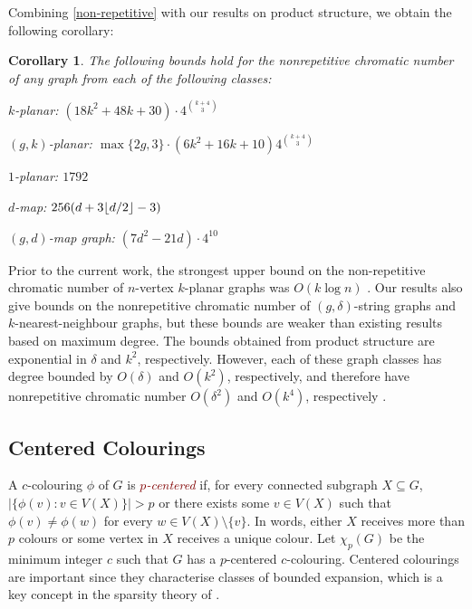 \documentclass{patmorin}
\theoremstyle{plain}
\newtheorem{cor}[thm]{Corollary}
\theoremstyle{definition}
\newcommand{\defin}[1]{\textcolor{Maroon}{\emph{#1}}}
\newcommand{\note}[2]{\noindent{\color{red}[#1:~#2]}}
\DeclarePairedDelimiter{\floor}{\lfloor}{\rfloor}
\begin{document}
Combining \cref{non-repetitive} with our results on product structure, we obtain the following corollary:
\begin{cor}\label{nonrepetitive_cor}
  The following bounds hold for the nonrepetitive chromatic number of any graph from each of the following classes:
  \begin{compactenum}
    \item $k$-planar: $(18k^2+48k+30)\cdot 4^{\binom{k+4}{3}}$
    \item $(g,k)$-planar: $\max\{2g,3\}\cdot(6k^2+16k+10) 4^{\binom{k+4}{3}}$
    \item $1$-planar: $1792$
    \item $d$-map: $256(d+3\floor{d/2}-3)$
    \item $(g,d)$-map graph: $(7d^2-21d)\cdot 4^{10}$
  \end{compactenum}
\note{DW}{I prefer bullets here}
\end{cor}

Prior to the current work, the strongest upper bound on the non-repetitive chromatic number of $n$-vertex  $k$-planar graphs was $O(k\log n)$ \cite{dujmovic.morin.ea:layered}.  Our results also give bounds on the nonrepetitive chromatic number of $(g,\delta)$-string graphs and $k$-nearest-neighbour graphs, but these bounds are weaker than existing results based on maximum degree.  The bounds obtained from product structure are exponential in $\delta$ and $k^2$, respectively.  However, each of these graph classes has degree bounded by $O(\delta)$ and $O(k^2)$, respectively, and therefore have nonrepetitive chromatic number $O(\delta^2)$ and $O(k^{4})$, respectively \cite{DJKW16}.

\subsection{Centered Colourings}
\label{centered-colourings}

A $c$-colouring $\phi$ of $G$ is \defin{$p$-centered} if, for every connected subgraph $X\subseteq G$, $|\{\phi(v):v\in V(X)\}| > p$ or there exists some $v\in V(X)$ such that $\phi(v)\neq \phi(w)$ for every $w\in V(X)\setminus\{v\}$.  In words, either $X$ receives more than $p$ colours or some vertex in $X$ receives a unique colour.  Let $\chi_p(G)$ be the minimum integer $c$ such that $G$ has a $p$-centered $c$-colouring. Centered colourings are important since they characterise classes of bounded expansion, which is a key concept in the sparsity theory of \citet{Sparsity}.
\end{document}
